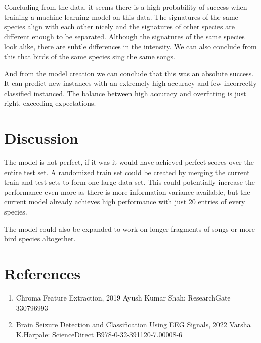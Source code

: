 \documentclass[
]{article}
\providecommand{\tightlist}{%
  \setlength{\itemsep}{0pt}\setlength{\parskip}{0pt}}
\begin{document}
Concluding from the data, it seems there is a high probability of
success when training a machine learning model on this data. The
signatures of the same species align with each other nicely and the
signatures of other species are different enough to be separated.
Although the signatures of the same species look alike, there are subtle
differences in the intensity. We can also conclude from this that birds
of the same species sing the same songs.

And from the model creation we can conclude that this was an absolute
success. It can predict new instances with an extremely high accuracy
and few incorrectly classified instanced. The balance between high
accuracy and overfitting is just right, exceeding expectations.

\hypertarget{discussion}{%
\section{Discussion}\label{discussion}}

The model is not perfect, if it was it would have achieved perfect
scores over the entire test set. A randomized train set could be created
by merging the current train and test sets to form one large data set.
This could potentially increase the performance even more as there is
more information variance available, but the current model already
achieves high performance with just 20 entries of every species.

The model could also be expanded to work on longer fragments of songs or
more bird species altogether. \newpage

\hypertarget{references}{%
\section{References}\label{references}}

\begin{enumerate}
\def\labelenumi{\arabic{enumi}.}
\tightlist
\item
  Chroma Feature Extraction, 2019 Ayush Kumar Shah: ResearchGate
  330796993 \label{ref:ref1}
\item
  Brain Seizure Detection and Classification Using EEG Signals, 2022
  Varsha K.Harpale: ScienceDirect B978-0-32-391120-7.00008-6
  \label{ref:ref2}
\end{enumerate}
\end{document}
